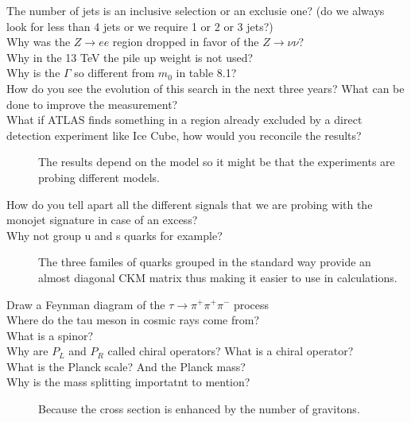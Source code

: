\documentclass[a4paper,10pt,twoside,notitlepage]{article}
\begin{document}
\begin{description}
\item[The number of jets is an inclusive selection or an exclusie one? (do we
  always look for less than 4 jets or we require 1 or 2 or 3 jets?)]

\item[Why was the $Z \rightarrow ee$ region dropped in favor of the
  $Z \rightarrow \nu \nu$?]

\item[Why in the 13 TeV the pile up weight is not used?]

\item[Why is the $\Gamma$ so different from $m_0$ in table 8.1?]

\item[How do you see the evolution of this search in the next three years? What
  can be done to improve the measurement?]

\item[What if ATLAS finds something in a region already excluded by a direct
  detection experiment like Ice Cube, how would you reconcile the results?] The
  results depend on the model so it might be that the experiments are probing
  different models.

\item[How do you tell apart all the different signals that we are probing with
  the monojet signature in case of an excess?]


\item[Why not group u and s quarks for example?] The three familes of quarks
  grouped in the standard way provide an almost diagonal CKM matrix thus making
  it easier to use in calculations.

\item[Draw a Feynman diagram of the $\tau \to \pi^+ \pi^+ \pi^-$ process]

\item[Where do the tau meson in cosmic rays come from?]

\item[What is a spinor?]

\item[Why are $P_L$ and $P_R$ called chiral operators? What is a chiral
  operator?]

\item[What is the Planck scale? And the Planck mass?]

\item[Why is the mass splitting importatnt to mention?] Because the cross
  section is enhanced by the number of gravitons.


\end{description}
\end{document}
